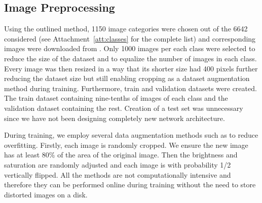 \subsection{Image Preprocessing}
Using the outlined method, 1150 image categories were chosen out of the 6642 considered (see Attachment~\ref{att:classes} for the complete list) and corresponding images were downloaded from \cite{ImageNetDownload}. Only 1000 images per each class were selected to reduce the size of the dataset and to equalize the number of images in each class. Every image was then resized in a way that its shorter size had 400 pixels further reducing the dataset size but still enabling cropping as a dataset augmentation method during training. Furthermore, train and validation datasets were created. The train dataset containing nine-tenths of images of each class and the validation dataset containing the rest. Creation of a test set was unnecessary since we have not been designing completely new network architecture.

During training, we employ several data augmentation methods such as \cite{simard2003best} to reduce overfitting. Firstly, each image is randomly cropped. We ensure the new image has at least 80\% of the area of the original image. Then the brightness and saturation are randomly adjusted and each image is with probability 1/2 vertically flipped. All the methods are not computationally intensive and therefore they can be performed online during training without the need to store distorted images on a disk.


